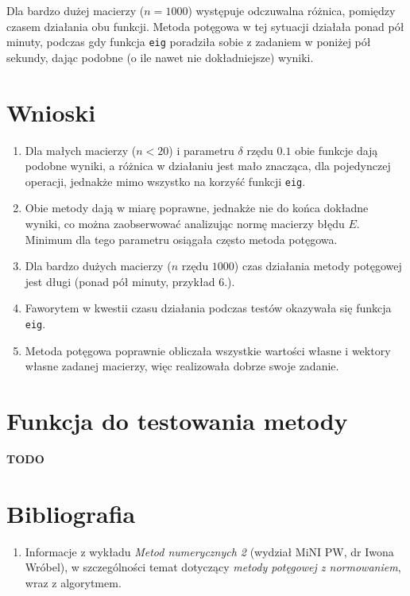 \documentclass[12pt]{article}
\begin{document}
\begin{enumerate}[label=\textbf{Przykład \arabic*}]
		Dla bardzo dużej macierzy ($n = 1000$) występuje odczuwalna różnica, pomiędzy czasem działania obu funkcji. Metoda potęgowa w tej sytuacji działała ponad pół minuty, podczas gdy funkcja \texttt{eig} poradziła sobie z zadaniem w poniżej pół sekundy, dając podobne (o ile nawet nie dokładniejsze) wyniki.
	\end{enumerate}
	
	
	
	
	\section{Wnioski}
	\begin{enumerate}
		\item Dla małych macierzy ($n < 20$) i parametru $\delta$ rzędu $0.1$ obie funkcje dają podobne wyniki, a różnica w działaniu jest mało znacząca, dla pojedynczej operacji, jednakże mimo wszystko na korzyść funkcji \texttt{eig}.
		
		\item Obie metody dają w miarę poprawne, jednakże nie do końca dokładne wyniki, co można zaobserwować analizując normę macierzy błędu $E$. Minimum dla tego parametru osiągała często metoda potęgowa.
		
		\item Dla bardzo dużych macierzy ($n$ rzędu $1000$) czas działania metody potęgowej jest długi (ponad pół minuty, przykład 6.).
		
		\item Faworytem w kwestii czasu działania podczas testów okazywała się funkcja \texttt{eig}.
		
		\item Metoda potęgowa poprawnie obliczała wszystkie wartości własne i wektory własne zadanej macierzy, więc realizowała dobrze swoje zadanie.
	\end{enumerate}
	
	
	
	\section{Funkcja do testowania metody}
	\textbf{TODO}
	
	
	
	\section{Bibliografia}
	\begin{enumerate}
		\item Informacje z wykładu \textit{Metod numerycznych 2} (wydział MiNI PW, dr Iwona Wróbel), w szczególności temat dotyczący \textit{metody potęgowej z normowaniem}, wraz z algorytmem.
	\end{enumerate}
	
\end{document}
